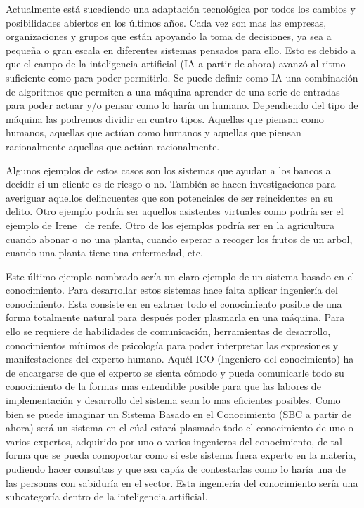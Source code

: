 \documentclass[11pt,a4paper,twoside,final]{article}
\begin{document}
Actualmente está sucediendo una adaptación tecnológica por todos los cambios y posibilidades abiertos en los últimos años.
Cada vez son mas las empresas, organizaciones y grupos que están apoyando la toma de decisiones, ya sea a pequeña o gran escala
en diferentes sistemas pensados para ello. Esto es debido a que el campo de la inteligencia artificial (IA a partir de ahora)
avanzó al ritmo suficiente como para poder permitirlo. Se puede definir como IA una combinación de algoritmos que permiten a
 una máquina aprender de una serie de entradas para poder actuar y/o pensar como lo haría un humano. Dependiendo del tipo de máquina
 las podremos dividir en cuatro tipos. Aquellas que piensan como humanos, aquellas que actúan como humanos y aquellas que piensan racionalmente
 aquellas que actúan racionalmente.

\smallskip
Algunos ejemplos de estos casos son los sistemas que ayudan a los bancos a decidir si un cliente es de riesgo o no. También se hacen investigaciones
 para averiguar aquellos delincuentes que son potenciales de ser reincidentes en su delito. Otro ejemplo podría ser aquellos asistentes virtuales como
 podría ser el ejemplo de Irene~\cite{irene} de renfe. Otro de los ejemplos podría ser en la agricultura cuando abonar o no una planta, cuando esperar a
 recoger los frutos de un arbol, cuando una planta tiene una enfermedad, etc.


\bigskip
Este último ejemplo nombrado sería un claro ejemplo de un sistema basado en el conocimiento. Para desarrollar estos sistemas hace falta aplicar ingeniería del conocimiento.
Esta consiste en en extraer todo el conocimiento posible de una forma totalmente natural para después poder plasmarla en una máquina. Para ello se requiere de habilidades
 de comunicación, herramientas de desarrollo, conocimientos mínimos de psicología para poder interpretar las expresiones y manifestaciones del experto humano. Aquél ICO (Ingeniero del conocimiento)
 ha de encargarse de que el experto se sienta cómodo y pueda comunicarle todo su conocimiento de la formas mas entendible posible para que las labores de implementación
 y desarrollo del sistema sean lo mas eficientes posibles. Como bien se puede imaginar un Sistema Basado en el Conocimiento (SBC a partir de ahora) será un sistema
 en el cúal estará plasmado todo el conocimiento de uno o varios expertos, adquirido por uno o varios ingenieros del conocimiento, de tal forma que se pueda comoportar
 como si este sistema fuera experto en la materia, pudiendo hacer consultas y que sea capáz de contestarlas como lo haría una de las personas con sabiduría en el sector.
 Esta ingeniería del conocimiento sería una subcategoría dentro de la inteligencia artificial.
\end{document}
